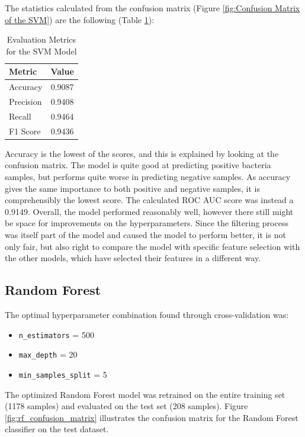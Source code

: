 \documentclass{article}
\begin{document}
The statistics calculated from the confusion matrix (Figure \ref{fig:Confusion Matrix of the SVM}) are the following (Table \ref{tab:evaluation_metrics_SVM}): 
\begin{table}[h!]
\centering
\caption{Evaluation Metrics for the SVM Model}
\label{tab:evaluation_metrics_SVM}
\begin{tabular}{|l|c|}
\hline
\textbf{Metric} & \textbf{Value} \\
\hline
Accuracy  & 0.9087 \\
Precision & 0.9408 \\
Recall    & 0.9464 \\
F1 Score  & 0.9436 \\
\hline
\end{tabular}
\end{table}
Accuracy is the lowest of the scores, and this is explained by looking at the confusion matrix. The model is quite good at predicting positive bacteria samples, but performs quite worse in predicting negative samples. As accuracy gives the same importance to both positive and negative samples, it is comprehensibly the lowest score. The calculated ROC AUC score was instead a 0.9149. Overall, the model performed reasonably well, however there still might be space for improvements on the hyperparameters.
Since the filtering process was itself part of the model and caused the model to perform better, it is not only fair, but also right to compare the model with specific feature selection with the other models, which have selected their features in a different way.

\clearpage
\subsection{Random Forest}


The optimal hyperparameter combination found through cross-validation was:
\begin{itemize}
    \item \texttt{n\_estimators} = 500
    \item \texttt{max\_depth} = 20
    \item \texttt{min\_samples\_split} = 5
\end{itemize}

The optimized Random Forest model was retrained on the entire training set (1178 samples) and evaluated on the test set (208 samples). Figure \ref{fig:rf_confusion_matrix} illustrates the confusion matrix for the Random Forest classifier on the test dataset.
\end{document}
